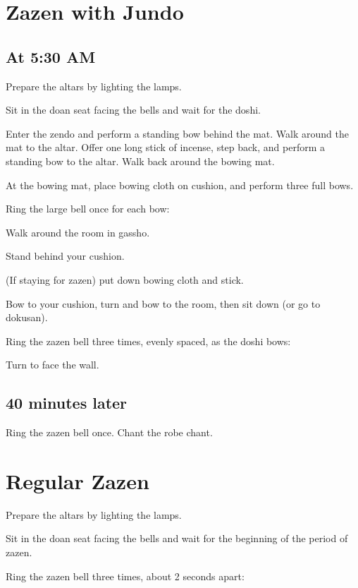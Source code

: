 \documentclass{kdo}
\begin{document}
\begin{services}

\chapter{Zazen with Jundo}

\renewcommand{\footmark}{\bellkey}
\section*{At 5:30 AM}

\doan Prepare the altars by lighting the lamps.

Sit in the doan seat facing the bells and wait for the doshi.

\doshi Enter the zendo and perform a standing bow behind the mat. Walk around
the mat to the altar. Offer one long stick of incense, step back, and perform a
standing bow to the altar. Walk back around the bowing mat.

At the bowing mat, place bowing cloth on cushion, and perform three full bows.

\doan Ring the large bell once for each bow:
\jundoBows

\doshi Walk around the room in gassho.

Stand behind your cushion.

(If staying for zazen) put down bowing cloth and stick.

Bow to your cushion, turn and bow to the room, then sit down (or go to dokusan).

\doan Ring the zazen bell three times, evenly spaced, as the doshi bows:
\jundoStartZazen

Turn to face the wall.

\section*{40 minutes later}
\doan Ring the zazen bell once. \bigspace\zazenbell
\sangha Chant the robe chant.

\chapter{Regular Zazen}
\doan Prepare the altars by lighting the lamps.

Sit in the doan seat facing the bells and wait for the beginning of the period
of zazen.

\doan Ring the zazen bell three times, about 2 seconds apart:
\startZazenBells


\end{services}
\end{document}
